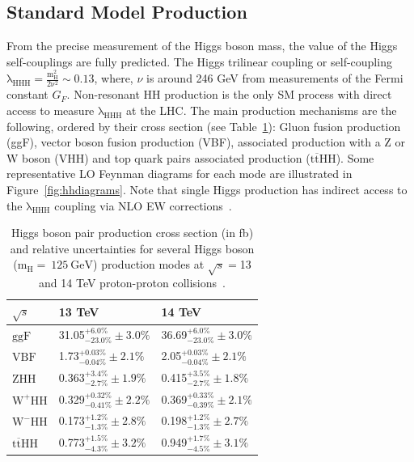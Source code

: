 \subsection{Standard Model Production}
From the precise measurement of the Higgs boson mass, the value of the Higgs self-couplings are fully predicted. The Higgs trilinear coupling or self-coupling $\mathrm{\lambda_{HHH} = \frac{m_{H}^{2}} { 2 {\nu}^{2}}\sim0.13}$, where, $\nu$ is around 246 GeV from measurements of the Fermi constant $G_{F}$. Non-resonant HH production is the only SM process with direct access to measure $\mathrm{\lambda_{HHH}}$ at the LHC. The main production mechanisms are the following, ordered by their cross section (see Table~\ref{tab:hhxs}): Gluon fusion production (ggF), vector boson fusion production (VBF), associated production with a Z or W boson (VHH) and top quark pairs associated production ($\mathrm{t\overline{t}HH}$). Some representative LO Feynman diagrams for each mode are illustrated in Figure~\ref{fig:hhdiagrams}. Note that single Higgs production has indirect access to the $\mathrm{\lambda_{HHH}}$ coupling via NLO EW corrections~\cite{Degrassi:2016wml,Maltoni:2017ims}.

\begin{table}[htb]
\centering
\caption[Higgs boson pair production cross section (in pb) and relative uncertainties]{\label{tab:hhxs} Higgs boson pair production cross section (in fb) and relative uncertainties for several Higgs boson ($\mathrm{m_{H}=~125~GeV}$) production modes at $\sqrt{s}=$13 and 14 TeV proton-proton collisions~\cite{DiMicco:2019ngk}.}
\begin{tabularx}{\textwidth}{XXX}
\hline
$\sqrt{s}$                  & 13 TeV                               & 14 TeV                                 \\
\hline
$\mathrm{ggF}$              & 31.05$^{+6.0\%}_{-23.0\%}\pm3.0\%$   &  36.69$^{+6.0\%}_{-23.0\%}\pm3.0\%$     \\[0pt]
$\mathrm{VBF}$              &   1.73$^{+0.03\%}_{-0.04\%}\pm2.1\%$ &  2.05$^{+0.03\%}_{-0.04\%}\pm2.1\%$    \\[0pt]
$\mathrm{ZHH}$              &  0.363$^{+3.4\%}_{-2.7\%}\pm1.9\%$   &  0.415$^{+3.5\%}_{-2.7\%}\pm1.8\%$     \\[0pt]
$\mathrm{W^{+}HH}$          &  0.329$^{+0.32\%}_{-0.41\%}\pm2.2\%$ &  0.369$^{+0.33\%}_{-0.39\%}\pm2.1\%$   \\[0pt]
$\mathrm{W^{-}HH}$          &  0.173$^{+1.2\%}_{-1.3\%}\pm2.8\%$   &  0.198$^{+1.2\%}_{-1.3\%}\pm2.7\%$     \\[0pt]
$\mathrm{t\overline{t}HH}$  &  0.773$^{+1.5\%}_{-4.3\%}\pm3.2\%$   &  0.949$^{+1.7\%}_{-4.5\%}\pm3.1\%$     \\[0pt]
\hline
\end{tabularx}
\end{table}

